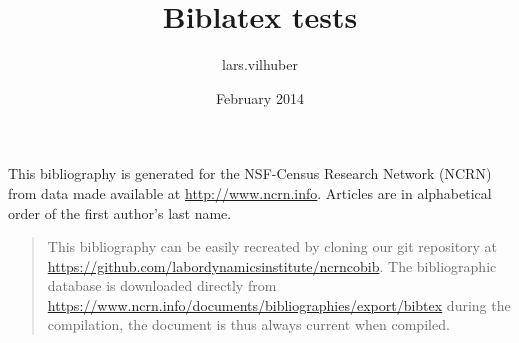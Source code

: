 \documentclass{article}
\title{Biblatex tests}
\author{lars.vilhuber }
\date{February 2014}
\begin{document}
\maketitle

This bibliography is generated for the NSF-Census Research Network (NCRN) from data made available at \url{http://www.ncrn.info}. Articles are in alphabetical order of the first author's last name.

\printbibliography[type=article,title={Articles}]
\printbibliography[type=report,title={Preprints and Working papers}]
\printbibliography[nottype=report,nottype=article,title={Other publications}]
\newpage
\begin{quote}
	\footnotesize
This bibliography can be easily recreated by cloning our git repository at \url{https://github.com/labordynamicsinstitute/ncrncobib}. The bibliographic database is downloaded directly from \url{https://www.ncrn.info/documents/bibliographies/export/bibtex} during the compilation, the document is thus always current when compiled.


\end{quote}
\end{document}
